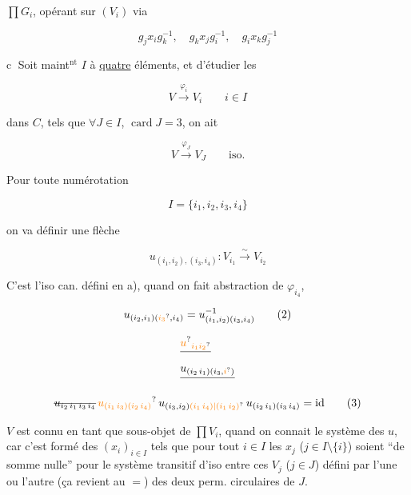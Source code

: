 $\prod G_i$, opérant sur $(V_i)$ via

\[
g_jx_i g_k^{-1},\quad g_kx_jg_i^{-1},\quad g_ix_kg_j^{-1}
\]



\textcircled{c} Soit maint$^{\mathrm{nt}}$ $I$  à \uline{quatre} éléments, et     d'étudier les

\[
 V\xrightarrow{\varphi_i}V_i\qquad i\in I
\]

dans $C$, tels que $\forall J\in I$, $\operatorname{card} J=3$, on ait

\[
V\xrightarrow{\varphi_J}V_J\qquad\text{iso.}
\]

Pour toute  numérotation

\[
 I=\{i_1,i_2,i_3,i_4\}
\]

on va définir une flèche

\[
 u_{(i_1,i_2),(i_3,i_4)}:V_{i_1}\xrightarrow{\sim}V_{i_2}
 \tag*{(1)}
\]


C'est l'iso can. défini en a), quand on fait abstraction de $\varphi_{i_4}$, 


\[
u_{(i_2,i_1)(\unsure{i_3},i_4)}
 =u_{(i_1,i_2)(i_3,i_4)}^{-1}\tag*{(2)}
\]


\[
\begin{aligned}
 &\deleted{\unsure{u}_{\unsure{i_1i_2}}}\\
 &\deleted{u_{(i_2\,i_1)(i_3,\unsure{i})}}
\end{aligned}
\]

\[
\deleted{u_{i_2\,i_1\,i_3\,i_4}}\,
\unsure{u_{(i_1\,i_3)(i_2\,i_4)}}\,
u_{(i_3,i_2)\unsure{(i_1\,i_4)|(i_1\,i_2)}}\,u_{(i_2\,i_1)(i_3\,i_4)}=\mathrm{id}\tag*{(3)}
\]

$V$ est connu en tant que sous-objet de $\prod V_i$, quand on connait le système des $u$, car c'est formé des $(x_i)_{i\in I}$ tels que pour tout $i\in I$  les $x_j$ ($j\in I\setminus\{i\}$) soient ``de somme nulle'' pour le système transitif d'iso entre ces $V_j$ ($j\in J$) défini par l'une ou l'autre (ça revient au $=$) des deux perm. circulaires de $J$.

